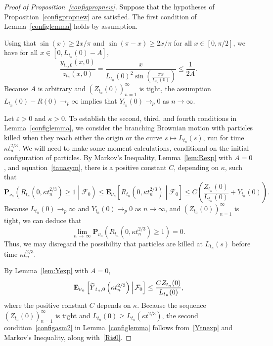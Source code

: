 \documentclass[AHL,Unicode,longabstracts,published]{cedram}
\newcommand*\eps{\varepsilon}
\newcommand*\E{\mathbf{E}}
\renewcommand*\P{\mathbf{P}}
\newcommand\F{\mathcal{F}}
\newcommand{\1} {\mathds{1}}
\let\oldtilde\tilde
\renewcommand*{\tilde}[1]{\mathchoice{\widetilde{#1}}{\widetilde{#1}}{\oldtilde{#1}}{\oldtilde{#1}}}
\begin{document}
\begin{proof}[Proof of Proposition~\ref{configpropnew}]
Suppose that the hypotheses of Proposition~\ref{configpropnew} are satisfied. The first condition of Lemma~\ref{configlemma} holds by assumption.

Using that $\sin(x) \geq 2x/\pi$ and $\sin(\pi - x) \geq 2x/\pi$ for all $x \in [0, \pi/2]$, we have for all $x \in [0, L_{t_n}(0) - A]$,
\begin{equation}\label{yzrat}
\frac{y_{t_n,0}(x,0)}{z_{t_n}(x,0)} = \frac{x}{L_{t_n}(0)^2 \sin\left(\frac{\pi x}{L_{t_n}(0)}\right)} \leq \frac{1}{2A}.
\end{equation}
Because $A$ is arbitrary and $(Z_{t_n}(0))_{n=1}^{\infty}$ is tight, the assumption $L_{t_n}(0) - R(0) \rightarrow_p \infty$ implies that $Y_{t_n}(0) \rightarrow_p 0$ as $n \rightarrow \infty$.

Let $\eps > 0$ and $\kappa > 0$. To establish the second, third, and fourth conditions in Lemma~\ref{configlemma}, we consider the branching Brownian motion with particles killed when they reach either the origin or the curve $s \mapsto L_{t_n}(s)$, run for time $\kappa t_n^{2/3}$. We will need to make some moment calculations, conditional on the initial configuration of particles. By Markov's Inequality, Lemma~\ref{lem:Rexp} with $A = 0$, and equation~\eqref{tauasym}, there is a positive constant $C$, depending on $\kappa$, such that
\[
\P_{\nu_n}\left(R_{t_n}\left(0, \kappa t_n^{2/3}\right) \geq 1\middle|\F_0\right) \leq \E_{\nu_n}\left[R_{t_n}\left(0, \kappa t_n^{2/3}\right)\middle|\F_0\right] \leq C \left(\frac{Z_{t_n}(0)}{L_{t_n}(0)} + Y_{t_n}(0) \right).
\]
Because $L_{t_n}(0) \rightarrow_p \infty$ and $Y_{t_n}(0) \rightarrow_p 0$ as $n \rightarrow \infty$, and $(Z_{t_n}(0))_{n=1}^{\infty}$ is tight, we can deduce that
\begin{equation}\label{Ris0}
\lim_{n\,\rightarrow\,\infty} \P_{\nu_n}\left(R_{t_n}\left(0, \kappa t_n^{2/3}\right) \geq 1\right) = 0.
\end{equation}
Thus, we may disregard the possibility that particles are killed at $L_{t_n}(s)$ before time $\kappa t_n^{2/3}$.

By Lemma~\ref{lem:Yexp} with $A = 0$,
\begin{equation}\label{Ytnexp}
\E_{\nu_n}\left[{\tilde Y}_{t_n,0}\left(\kappa t_n^{2/3}\right)\,\middle|\,\F_0\right] \leq \frac{C Z_{t_n}(0)}{L_{t_n}(0)},
\end{equation}
where the positive constant $C$ depends on $\kappa$. Because the sequence $(Z_{t_n}(0))_{n=1}^{\infty}$ is tight and $L_{t_n}(0) \geq L_{t_n}(\kappa t^{2/3})$, the second condition~\eqref{configasm2} in Lemma~\ref{configlemma} follows from~\eqref{Ytnexp} and Markov's Inequality, along with~\eqref{Ris0}.


\end{proof}
\end{document}
